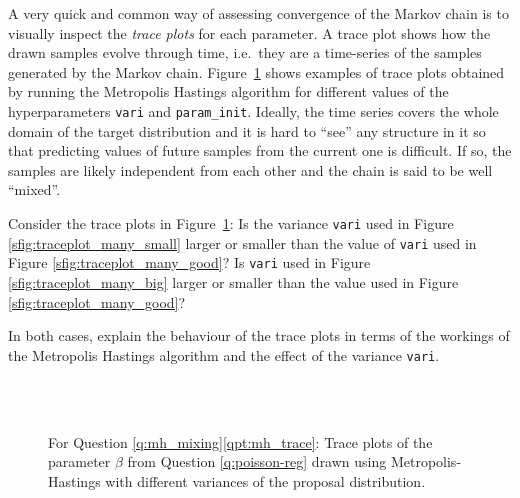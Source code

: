 A very quick and common way of assessing convergence of the Markov
chain is to visually inspect the \emph{trace plots} for each
parameter. A trace plot shows how the drawn samples evolve through
time, i.e.\ they are a time-series of the samples generated by the
Markov chain. Figure~\ref{fig:traceplots} shows examples of trace
plots obtained by running the Metropolis Hastings algorithm for
different values of the hyperparameters \lstinline{vari} and
\lstinline{param_init}. Ideally, the time series covers the whole
domain of the target distribution and it is hard to ``see'' any
structure in it so that predicting values of future samples from the
current one is difficult. If so, the samples are likely independent from
each other and the chain is said to be well ``mixed''.

\begin{exenumerate}
  \item \label{qpt:mh_trace}  Consider the trace plots in Figure~\ref{fig:traceplots}: Is
    the variance \lstinline{vari} used in Figure
    \ref{sfig:traceplot_many_small} larger or smaller than the value of
    \lstinline{vari} used in Figure \ref{sfig:traceplot_many_good}? Is
    \lstinline{vari} used in Figure \ref{sfig:traceplot_many_big}
    larger or smaller than the value used in Figure
    \ref{sfig:traceplot_many_good}?

    In both cases, explain the behaviour of the trace plots in terms of
    the workings of the Metropolis Hastings algorithm and the effect of
    the variance \lstinline{vari}.

    \begin{figure}[p]
      \setcounter{subfigure}{0}%
	\centering
	\\
	\\
	\caption{For Question \ref{q:mh_mixing}\ref{qpt:mh_trace}: Trace plots of the parameter $\beta$ from Question \ref{q:poisson-reg} drawn using Metropolis-Hastings with different variances of the proposal distribution.}
	\label{fig:traceplots}
\end{figure}
%


\end{exenumerate}

